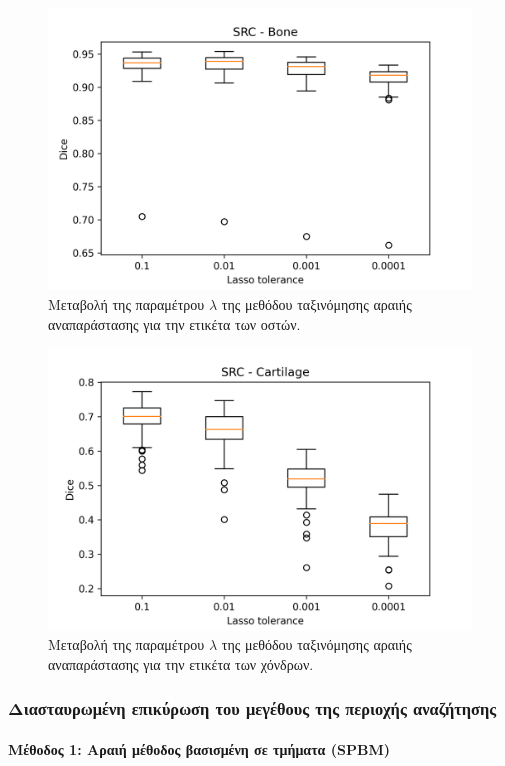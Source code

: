 \documentclass[a4paper,12pt]{article}
\newcommand{\paragraphLine}[1]{\paragraph{#1}\mbox{}}
\begin{document}
\begin{figure}[H]
    \centering
    \includegraphics[width=0.85\linewidth]{SRC_Lasso_tolerance_Bone_plot.png}
    \caption{Μεταβολή της παραμέτρου $\lambda$ της μεθόδου ταξινόμησης αραιής
             αναπαράστασης για την ετικέτα των οστών.}
    \label{fig:SRC:lambda:2}
\end{figure}

\begin{figure}[H]
    \centering
    \includegraphics[width=0.85\linewidth]{SRC_Lasso_tolerance_Cartilage_plot.png}
    \caption{Μεταβολή της παραμέτρου $\lambda$ της μεθόδου ταξινόμησης αραιής
             αναπαράστασης για την ετικέτα των χόνδρων.}
    \label{fig:SRC:lambda:3}
\end{figure}


\subsubsection{Διασταυρωμένη επικύρωση του μεγέθους της περιοχής αναζήτησης}

\paragraphLine{Μέθοδος 1: Αραιή μέθοδος βασισμένη σε τμήματα (SPBM)}
\end{document}
